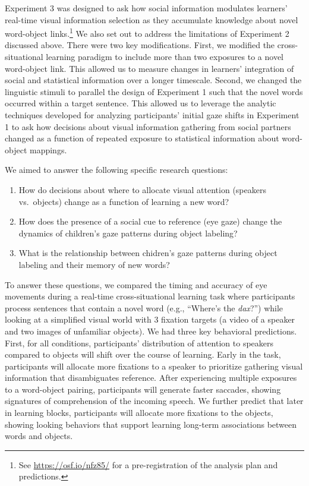 \documentclass[man,floatsintext]{apa6}
\providecommand{\tightlist}{%
  \setlength{\itemsep}{0pt}\setlength{\parskip}{0pt}}
\let\rmarkdownfootnote\footnote%
\def\footnote{\protect\rmarkdownfootnote}
\begin{document}
Experiment 3 was designed to ask how social information modulates
learners' real-time visual information selection as they accumulate
knowledge about novel word-object links.\footnote{See
  \url{https://osf.io/nfz85/} for a pre-registration of the analysis
  plan and predictions.} We also set out to address the limitations of
Experiment 2 discussed above. There were two key modifications. First,
we modified the cross-situational learning paradigm to include more than
two exposures to a novel word-object link. This allowed us to measure
changes in learners' integration of social and statistical information
over a longer timescale. Second, we changed the linguistic stimuli to
parallel the design of Experiment 1 such that the novel words occurred
within a target sentence. This allowed us to leverage the analytic
techniques developed for analyzing participants' initial gaze shifts in
Experiment 1 to ask how decisions about visual information gathering
from social partners changed as a function of repeated exposure to
statistical information about word-object mappings.

\noindent
We aimed to answer the following specific research questions:

\begin{enumerate}
\def\labelenumi{\arabic{enumi}.}
\tightlist
\item
  How do decisions about where to allocate visual attention (speakers
  vs.~objects) change as a function of learning a new word?
\item
  How does the presence of a social cue to reference (eye gaze) change
  the dynamics of children's gaze patterns during object labeling?
\item
  What is the relationship between chidren's gaze patterns during object
  labeling and their memory of new words?
\end{enumerate}

To answer these questions, we compared the timing and accuracy of eye
movements during a real-time cross-situational learning task where
participants process sentences that contain a novel word (e.g.,
\enquote{Where's the \emph{dax}?}) while looking at a simplified visual
world with 3 fixation targets (a video of a speaker and two images of
unfamiliar objects). We had three key behavioral predictions. First, for
all conditions, participants' distribution of attention to speakers
compared to objects will shift over the course of learning. Early in the
task, participants will allocate more fixations to a speaker to
prioritize gathering visual information that disambiguates reference.
After experiencing multiple exposures to a word-object pairing,
participants will generate faster saccades, showing signatures of
comprehension of the incoming speech. We further predict that later in
learning blocks, participants will allocate more fixations to the
objects, showing looking behaviors that support learning long-term
associations between words and objects.
\end{document}
